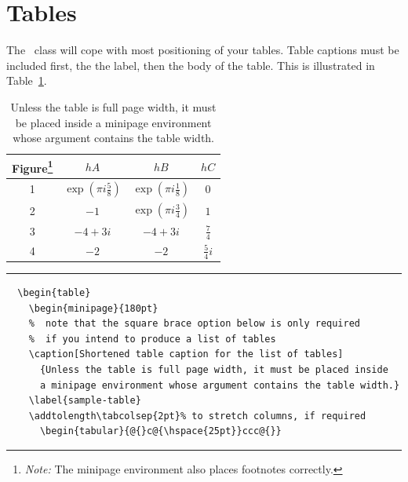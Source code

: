 \section{Tables}

The \cambridge\ class will cope with most positioning of your tables. Table captions must be included first, the the label, then the body of the table. This is illustrated in Table~\ref{sample-table}.
  \begin{table}[h!]
    \begin{minipage}{180pt}
    \caption[Shortened table caption for the list of tables]
      {Unless the table is full page width, it must be placed inside
      a minipage environment whose argument contains the table width.}
    \label{sample-table}
    \addtolength\tabcolsep{2pt}%
      \begin{tabular}{@{}c@{\hspace{25pt}}ccc@{}}
        \hline \hline
        Figure\footnote{\textit{Note:} The minipage environment
          also places footnotes correctly.}
          & $hA$ & $hB$ & $hC$\\
        \hline
        1 & $\exp\left(\pi i\frac58\right)$
          & $\exp\left(\pi i\frac18\right)$ & $0$\\[3pt]
        2 & $-1$    & $\exp\left(\pi i\frac34\right)$ & $1$\\[11pt]
        3 & $-4+3i$ & $-4+3i$ & $\frac74$\\[3pt]
        4 & $-2$    & $-2$    & $\frac54 i$ \\
        \hline \hline
      \end{tabular}
    \end{minipage}
    \rule[-20pt]{\textwidth}{0.5pt}
\begin{verbatim}
  \begin{table}
    \begin{minipage}{180pt}
    %  note that the square brace option below is only required
    %  if you intend to produce a list of tables
    \caption[Shortened table caption for the list of tables]
      {Unless the table is full page width, it must be placed inside
      a minipage environment whose argument contains the table width.}
    \label{sample-table}
    \addtolength\tabcolsep{2pt}% to stretch columns, if required
      \begin{tabular}{@{}c@{\hspace{25pt}}ccc@{}}

\end{verbatim}
\end{table}
